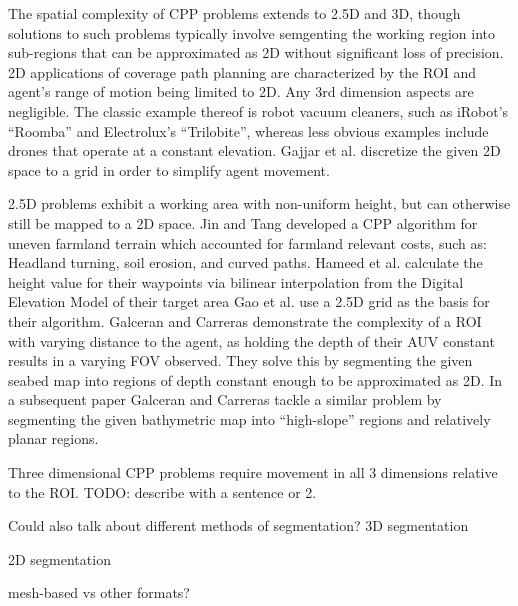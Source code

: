 The spatial complexity of CPP problems extends to 2.5D and 3D, though solutions to such problems typically involve semgenting the working region into sub-regions that can be approximated as 2D without significant loss of precision.
2D applications of coverage path planning are characterized by the ROI and agent's range of motion being limited to 2D.
Any 3rd dimension aspects are negligible.
The classic example thereof is robot vacuum cleaners, such as iRobot's ``Roomba'' and Electrolux's ``Trilobite''\cite{CCPP_cleaning_robots}, whereas less obvious examples include drones that operate at a constant elevation\cite{CPP_2D_convex_regions_uav}.
Gajjar et al. discretize the given 2D space to a grid in order to simplify agent movement\cite{CCPP_known_2D_env}.

2.5D problems exhibit a working area with non-uniform height, but can otherwise still be mapped to a 2D space.
Jin and Tang developed a CPP algorithm for uneven farmland terrain which accounted for farmland relevant costs, such as: Headland turning, soil erosion, and curved paths\cite{CPP_farming_terrain}.
Hameed et al. calculate the height value for their waypoints via bilinear interpolation from the Digital Elevation Model of their target area\cite{CPP_2.5D_agriculture}
Gao et al. use a 2.5D grid as the basis for their algorithm\cite{CPP_2.5D_grid_map}.
Galceran and Carreras demonstrate the complexity of a ROI with varying distance to the agent\cite{CPP_2.5D_seabed_2012}, as holding the depth of their AUV constant results in a varying FOV observed.
They solve this by segmenting the given seabed map into regions of depth constant enough to be approximated as 2D.
In a subsequent paper Galceran and Carreras tackle a similar problem by segmenting the given bathymetric map into ``high-slope'' regions and relatively planar regions\cite{CPP_2.5D_seabed_2013}.

Three dimensional CPP problems require movement in all 3 dimensions relative to the ROI\cite{CPP_survey_for_robotics}.
TODO: describe \cite{HiCPP_cplx_3D_env} with a sentence or 2.

Could also talk about different methods of segmentation?
3D segmentation

2D segmentation

mesh-based vs other formats?

